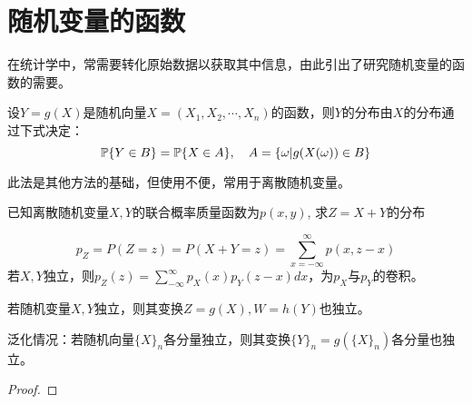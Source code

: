 \section{随机变量的函数}

在统计学中，常需要转化原始数据以获取其中信息，由此引出了研究随机变量的函数的需要。

\begin{theorem}[随机变量的函数的分布]
    设$Y=g(X)$是随机向量$X=(X_1,X_2,\cdots ,X_n)$的函数，则$Y$的分布由$X$的分布通过下式决定：
    \[ \P\{Y \in B\} = \P\{X \in A\}, \quad A=\{ \omega |g(X(\omega))\in B\} \]
\end{theorem}

此法是其他方法的基础，但使用不便，常用于离散随机变量。

\begin{example}[离散卷积公式]\label{exp:sum_of_pmf}
    已知离散随机变量$X,Y$的联合概率质量函数为$p(x,y)$, 求$Z=X+Y$的分布
\end{example}
\begin{solution}
    \[ p_Z=P(Z=z)=P(X+Y=z)=\sum_{x=-\infty}^{\infty}p(x, z-x) \]
    若$X,Y$独立，则$p_Z(z)=\sum_{-\infty}^{\infty}p_X(x)p_Y(z-x)dx$，为$p_X$与$p_Y$的卷积。
\end{solution}

\begin{theorem}[]
    若随机变量$X,Y$独立，则其变换$Z=g(X), W=h(Y)$也独立。

    泛化情况：若随机向量$\{X\}_n$各分量独立，则其变换$\{Y\}_n=g(\{X\}_n)$各分量也独立。
\end{theorem}
\begin{proof}
\end{proof}

